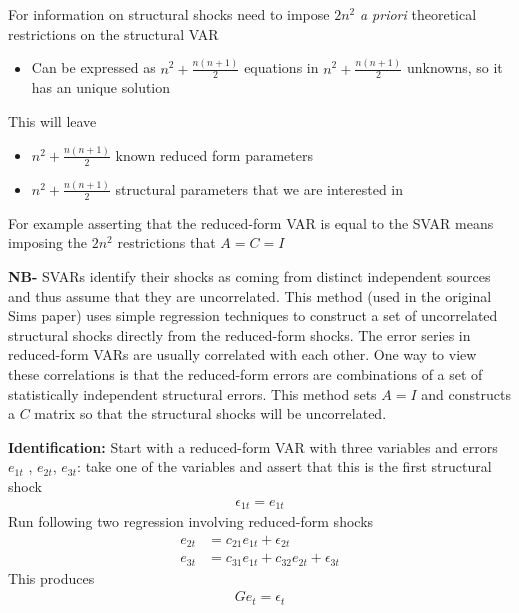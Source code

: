 \documentclass{beamer}
\begin{document}
\begin{frame}
  For information on structural shocks need to impose $2n^2$ \textit{a priori} theoretical restrictions on the structural VAR
  \begin{itemize}
    \item Can be expressed as $n^2+\frac{n(n+1)}{2}$ equations in $n^2+\frac{n(n+1)}{2}$ unknowns, so it has an unique solution
  \end{itemize}
  \medskip
  This will leave
  \begin{itemize}
    \item $n^2+\frac{n(n+1)}{2}$ known reduced form parameters
    \item $n^2+\frac{n(n+1)}{2}$ structural parameters that we are interested in
  \end{itemize} 
  For example asserting that the reduced-form VAR is equal to the SVAR means imposing the $2n^2$ restrictions that $A=C=I$
\end{frame}



\begin{frame}
  \textbf{NB-} SVARs identify their shocks as coming from distinct independent sources and thus assume that they are uncorrelated.
  This method (used in the original Sims paper) uses simple regression techniques to construct a set of uncorrelated structural shocks directly from the reduced-form shocks.
  The error series in reduced-form VARs are usually correlated with each other. 
  One way to view these correlations is that the reduced-form errors are combinations of a set of statistically independent structural errors.
  This method sets $A = I$ and constructs a $C$ matrix so that the structural shocks will be uncorrelated.
\end{frame}

\begin{frame}
  \textbf{Identification:} Start with a reduced-form VAR with three variables and errors $e_{1t}$ , $e_{2t}$, $e_{3t}$: take one of the variables and assert that this is the first structural shock
  \begin{align}
    \epsilon_{1t} = e_{1t} 
  \end{align}
  \medskip
  Run following two regression involving reduced-form shocks
  \begin{align}
    e_{2t} &= c_{21}e_{1t} + \epsilon_{2t}\\
    e_{3t} &= c_{31}e_{1t} + c_{32}e_{2t} + \epsilon_{3t}  
  \end{align}
  \medskip
  This produces
  \begin{align}
    Ge_t= \epsilon_t
  \end{align}
\end{frame}
\end{document}
